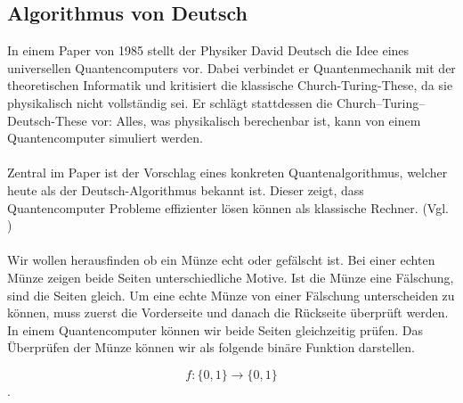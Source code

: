 \subsection{Algorithmus von Deutsch} 

In einem Paper von 1985 stellt der Physiker David Deutsch die Idee eines universellen Quantencomputers vor. Dabei verbindet er Quantenmechanik mit der theoretischen Informatik und kritisiert die klassische Church-Turing-These, da sie physikalisch nicht vollständig sei. Er schlägt stattdessen die Church–Turing–Deutsch-These vor: Alles, was physikalisch berechenbar ist, kann von einem Quantencomputer simuliert werden.\\
\\
Zentral im Paper ist der Vorschlag eines konkreten Quantenalgorithmus, welcher heute als der Deutsch-Algorithmus bekannt ist. Dieser zeigt, dass Quantencomputer Probleme effizienter lösen können als klassische Rechner.  (Vgl. \cite{deutsch_quantum_1985}) \\
\\
Wir wollen herausfinden ob ein Münze echt oder gefälscht ist. Bei einer echten Münze zeigen beide Seiten unterschiedliche Motive. Ist die Münze eine Fälschung, sind die Seiten gleich. Um eine echte Münze von einer Fälschung unterscheiden zu können, muss zuerst die Vorderseite und danach die Rückseite überprüft werden. In einem Quantencomputer können wir beide Seiten gleichzeitig prüfen. Das Überprüfen der Münze können wir als folgende binäre Funktion darstellen.

$$f:\{0,1\} \rightarrow \{0,1\}$$. 

